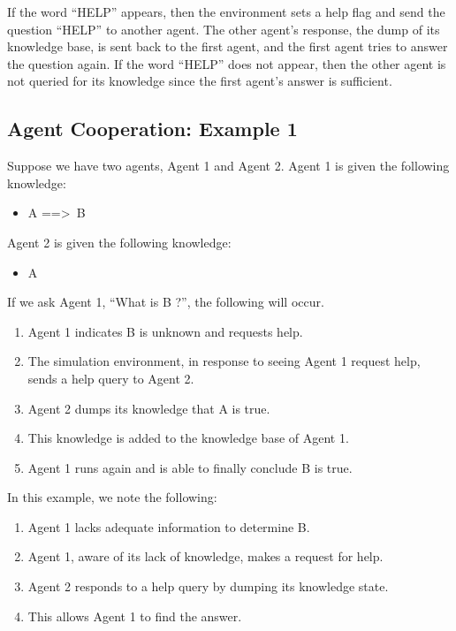 \documentclass{article}
\begin{document}
If the word ``HELP'' appears, then the environment sets a help flag and send the question ``HELP'' to another agent. The other agent's response, the dump of its knowledge base, is sent back to the first agent, and the first agent tries to answer the question again. If the word ``HELP'' does not appear, then the other agent is not queried for its knowledge since the first agent's answer is sufficient.

\subsection{Agent Cooperation: Example 1}
\label{example_1}

Suppose we have two agents, Agent 1 and Agent 2. Agent 1 is given the following knowledge:

\begin{itemize}
	\item A ==\textgreater \, B
\end{itemize}

Agent 2 is given the following knowledge:

\begin{itemize}
	\item A
\end{itemize}

If we ask Agent 1, ``What is B ?'', the following will occur.

\begin{enumerate}
	\item Agent 1 indicates B is unknown and requests help.
	\item The simulation environment, in response to seeing Agent 1 request help, sends a help query to Agent 2.
	\item Agent 2 dumps its knowledge that A is true.
	\item This knowledge is added to the knowledge base of Agent 1.
	\item Agent 1 runs again and is able to finally conclude B is true.
\end{enumerate}

In this example, we note the following:

\begin{enumerate}
	\item Agent 1 lacks adequate information to determine B. 
	\item Agent 1, aware of its lack of knowledge, makes a request for help.
	\item Agent 2 responds to a help query by dumping its knowledge state.
	\item This allows Agent 1 to find the answer.
\end{enumerate}
\end{document}
